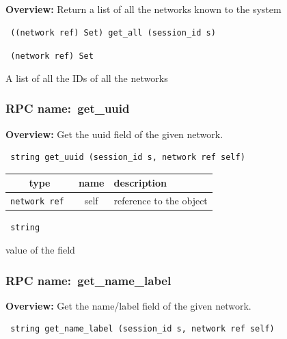 {\bf Overview:} 
Return a list of all the networks known to the system

\begin{verbatim} ((network ref) Set) get_all (session_id s)\end{verbatim}


\vspace{0.3cm}

{\tt 
(network ref) Set
}


A list of all the IDs of all the networks
\vspace{0.3cm}
\vspace{0.3cm}
\vspace{0.3cm}
\subsubsection{RPC name:~get\_uuid}

{\bf Overview:} 
Get the uuid field of the given network.

\begin{verbatim} string get_uuid (session_id s, network ref self)\end{verbatim}



 
\vspace{0.3cm}
\begin{tabular}{|c|c|p{7cm}|}
 \hline
{\bf type} & {\bf name} & {\bf description} \\ \hline
{\tt network ref } & self & reference to the object \\ \hline 

\end{tabular}

\vspace{0.3cm}

{\tt 
string
}


value of the field
\vspace{0.3cm}
\vspace{0.3cm}
\vspace{0.3cm}
\subsubsection{RPC name:~get\_name\_label}

{\bf Overview:} 
Get the name/label field of the given network.

\begin{verbatim} string get_name_label (session_id s, network ref self)\end{verbatim}


